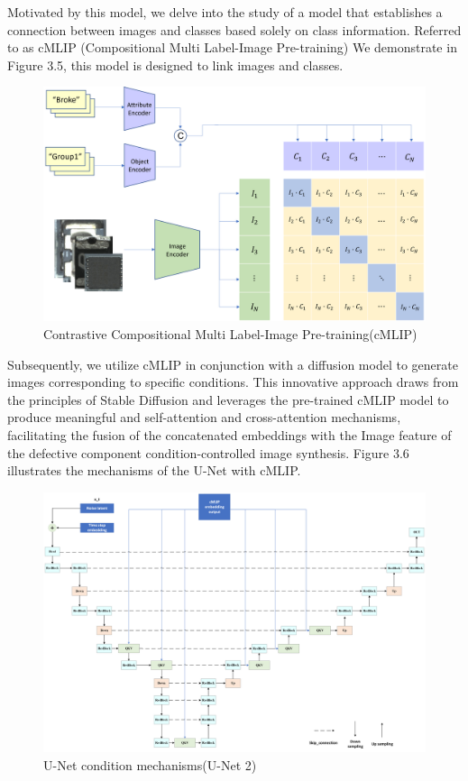 Motivated by this model, we delve into the study of a model that establishes a connection between images and classes based solely on class information. Referred to as cMLIP (Compositional  Multi Label-Image Pre-training) We demonstrate in Figure 3.5, this model is designed to link images and classes.
\begin{figure}[H]
    \centering
    \includegraphics[width=1\linewidth]{cMLIP.png}
    \caption{Contrastive Compositional  Multi Label-Image Pre-training(cMLIP) }
    \label{fig:enter-label}
\end{figure}
Subsequently, we utilize cMLIP in conjunction with a diffusion model to generate images corresponding to specific conditions. This innovative approach draws from the principles of Stable Diffusion and leverages the pre-trained cMLIP model to produce meaningful and self-attention and cross-attention mechanisms, facilitating the fusion of the concatenated embeddings with the Image feature of the defective component condition-controlled image synthesis. Figure 3.6 illustrates the mechanisms of the U-Net with cMLIP.

\begin{figure}
    \centering
    \includegraphics[height=!,width=0.95\linewidth,keepaspectratio=true]{Unet - cMLIP.png}
    \caption{U-Net condition mechanisms(U-Net 2)}
    \label{fig:enter-label}
\end{figure}
\newpage
